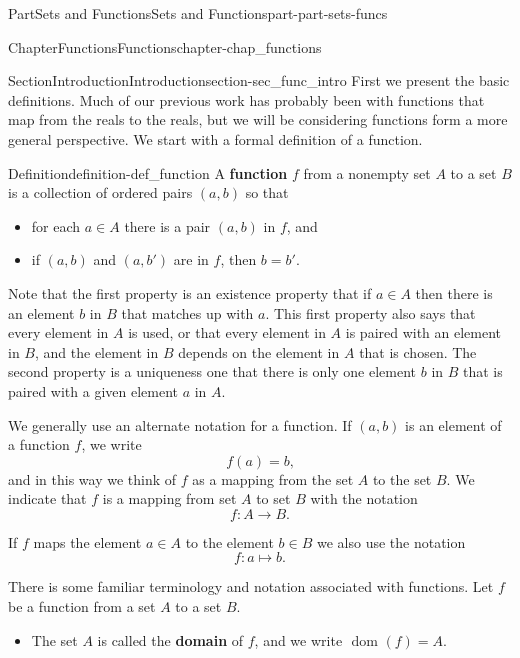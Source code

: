 \documentclass[oneside,10pt,]{book}
\newcommand{\terminology}[1]{\textbf{#1}}
\numberwithin{equation}{chapter}
\begin{document}
\begin{partptx}{Part}{Sets and Functions}{}{Sets and Functions}{}{}{part-part-sets-funcs}
\begin{chapterptx}{Chapter}{Functions}{}{Functions}{}{}{chapter-chap_functions}
\begin{sectionptx}{Section}{Introduction}{}{Introduction}{}{}{section-sec_func_intro}
First we present the basic definitions. Much of our previous work has probably been with functions that map from the reals to the reals, but we will be considering functions form a more general perspective. We start with a formal definition of a function.%
\begin{definition}{Definition}{}{definition-def_function}%
%
A \terminology{function} \(f\) from a nonempty set \(A\) to a set \(B\) is a collection of ordered pairs \((a,b)\) so that%
\begin{itemize}[label=\textbullet]
\item{}for each \(a \in A\) there is a pair \((a,b)\) in \(f\), and%
\item{}if \((a,b)\) and \((a,b')\) are in \(f\), then \(b=b'\).%
\end{itemize}
%
\end{definition}
Note that the first property is an existence property \textemdash{} that if \(a \in A\) then there is an element \(b\) in \(B\) that matches up with \(a\). This first property also says that every element in \(A\) is used, or that every element in \(A\) is paired with an element in \(B\), and the element in \(B\) depends on the element in \(A\) that is chosen. The second property is a uniqueness one \textemdash{} that there is only one element \(b\) in \(B\) that is paired with a given element \(a\) in \(A\).%
\par
We generally use an alternate notation for a function. If \((a,b)\) is an element of a function \(f\), we write%
\begin{equation*}
f(a)=b\text{,}
\end{equation*}
and in this way we think of \(f\) as a mapping from the set \(A\) to the set \(B\). We indicate that \(f\) is a mapping from set \(A\) to set \(B\) with the notation%
\begin{equation*}
f : A \to B\text{.}
\end{equation*}
%
\par
If \(f\) maps the element \(a \in A\) to the element \(b \in B\) we also use the notation%
\begin{equation*}
f : a \mapsto b\text{.}
\end{equation*}
%
\par
There is some familiar terminology and notation associated with functions. Let \(f\) be a function from a set \(A\) to a set \(B\).%
\begin{itemize}[label=\textbullet]
\item{}The set \(A\) is called the \terminology{domain}  of \(f\), and we write \(\text{ dom } (f) = A\).%

\end{itemize}
\end{sectionptx}
\end{chapterptx}
\end{partptx}
\end{document}
